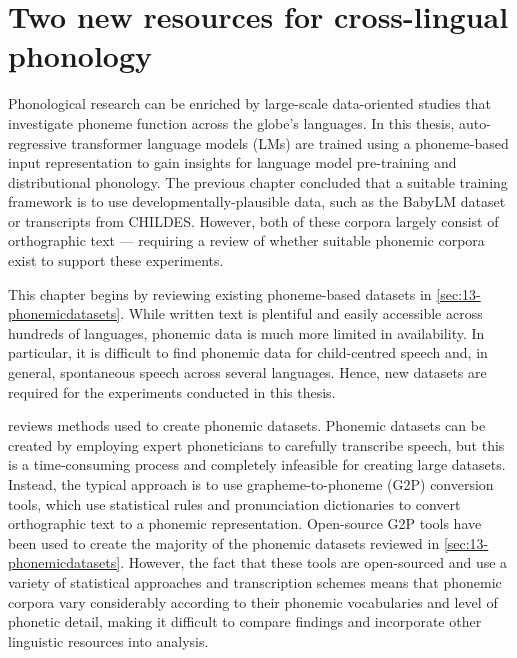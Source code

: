\chapter{Two new resources for cross-lingual phonology}\label{chapter:resources}


Phonological research can be enriched by large-scale data-oriented studies that investigate phoneme function across the globe's languages. In this thesis, auto-regressive transformer language models (LMs) are trained using a phoneme-based input representation to gain insights for language model pre-training and distributional phonology. The previous chapter concluded that a suitable training framework is to use developmentally-plausible data, such as the BabyLM dataset or transcripts from CHILDES. However, both of these corpora largely consist of orthographic text --- requiring a review of whether suitable phonemic corpora exist to support these experiments.

This chapter begins by reviewing existing phoneme-based datasets in \cref{sec:13-phonemicdatasets}. While written text is plentiful and easily accessible across hundreds of languages, phonemic data is much more limited in availability. In particular, it is difficult to find phonemic data for child-centred speech and, in general, spontaneous speech across several languages. Hence, new datasets are required for the experiments conducted in this thesis.


 reviews methods used to create phonemic datasets. Phonemic datasets can be created by employing expert phoneticians to carefully transcribe speech, but this is a time-consuming process and completely infeasible for creating large datasets. Instead, the typical approach is to use grapheme-to-phoneme (G2P) conversion tools, which use statistical rules and pronunciation dictionaries to convert orthographic text to a phonemic representation. Open-source G2P tools have been used to create the majority of the phonemic datasets reviewed in \cref{sec:13-phonemicdatasets}. However, the fact that these tools are open-sourced and use a variety of statistical approaches and transcription schemes means that phonemic corpora vary considerably according to their phonemic vocabularies and level of phonetic detail, making it difficult to compare findings and incorporate other linguistic resources into analysis.

